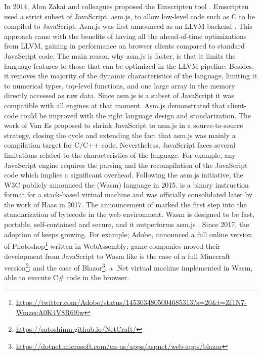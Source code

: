 In 2014, Alon Zakai and colleagues proposed the Emscripten tool \cite{emscripten}. Emscripten used a strict subset of JavaScript, asm.js, to allow low-level code such as C to be compiled to JavaScript. Asm.js was first announced as an LLVM backend \cite{asmjsweb}. This approach came with the benefits of having all the ahead-of-time optimizations from LLVM, gaining in performance on browser clients \cite{asmjs} compared to standard JavaScript code. The main reason why asm.js is faster, is that it limits the language features to those that can be optimized in the LLVM pipeline. Besides, it removes the majority of the dynamic characteristics of the language, limiting it to numerical types, top-level functions, and one large array in the memory directly accessed as raw data. Since asm.js is a subset of JavaScript it was compatible with all engines at that moment. Asm.js demonstrated that client-code could be improved with the right language design and standarization.
The work of Van Es \etal \cite{EsAsm.js} proposed to shrink JavaScript to asm.js in a source-to-source strategy, closing the cycle and extending the fact that asm.js was mainly a compilation target for C/C++ code. 
%
Nevertheless, JavaScript faces several limitations related to the characteristics of the language. For example, any JavaScript engine requires the parsing and the recompilation of the JavaScript code which implies a significant overhead.
Following the asm.js initiative, the W3C publicly announced the \wasm (Wasm) language in 2015. \wasm is a binary instruction format for a stack-based virtual machine and was officially consolidated later by the work of Haas \etal \cite{Haas_2017} in 2017. The announcement of \wasm marked the first step into the standarization of bytecode in the web environment. Wasm  is designed to be fast, portable, self-contained and secure, and it outperforms asm.js \cite{Haas_2017}. Since 2017, the adoption of \wasm keeps growing. For example; Adobe, announced a full online version of Photoshop\footnote{\url{https://twitter.com/Adobe/status/1453034805004685313?s=20&t=Zf1N7-WmzecA0K4V8R69lw}} written in WebAssembly;  game companies moved their development from JavaScript to Wasm like is the case of a full Minecraft version\footnote{\url{https://satoshinm.github.io/NetCraft/}}; and the case of Blazor\footnote{\url{https://dotnet.microsoft.com/en-us/apps/aspnet/web-apps/blazor}}, a .Net virtual machine implemented in Wasm, able to execute C\# code in the browser.

